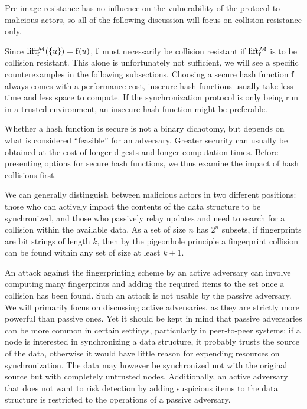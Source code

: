 Pre-image resistance has no influence on the vulnerability of the protocol to malicious actors, so all of the following discussion will focus on collision resistance only.

Since $\operatorname{lift_{\operatorname{f}}^{\mathcal{M}}}(\{u\}) = \operatorname{f}(u)$, $\operatorname{f}$ must necessarily be collision resistant if $\operatorname{lift_{\operatorname{f}}^{\mathcal{M}}}$ is to be collision resistant. This alone is unfortunately not sufficient, we will see a specific counterexamples in the following subsections. Choosing a secure hash function $\operatorname{f}$ always comes with a performance cost, insecure hash functions usually take less time and less space to compute. If the synchronization protocol is only being run in a trusted environment, an insecure hash function might be preferable.

Whether a hash function is secure is not a binary dichotomy, but depends on what is considered ``feasible'' for an adversary. Greater security can usually be obtained at the cost of longer digests and longer computation times. Before presenting options for secure hash functions, we thus examine the impact of hash collisions first.

We can generally distinguish between malicious actors in two different positions: those who can actively impact the contents of the data structure to be synchronized, and those who passively relay updates and need to search for a collision within the available data. As a set of size $n$ has $2^n$ subsets, if fingerprints are bit strings of length $k$, then by the pigeonhole principle a fingerprint collision can be found within any set of size at least $k + 1$.

An attack against the fingerprinting scheme by an active adversary can involve computing many fingerprints and adding the required items to the set once a collision has been found. Such an attack is not usable by the passive adversary. We will primarily focus on discussing active adversaries, as they are strictly more powerful than passive ones. Yet it should be kept in mind that passive adversaries can be more common in certain settings, particularly in peer-to-peer systems: if a node is interested in synchronizing a data structure, it probably trusts the source of the data, otherwise it would have little reason for expending resources on synchronization. The data may however be synchronized not with the original source but with completely untrusted nodes. Additionally, an active adversary that does not want to risk detection by adding suspicious items to the data structure is restricted to the operations of a passive adversary.

